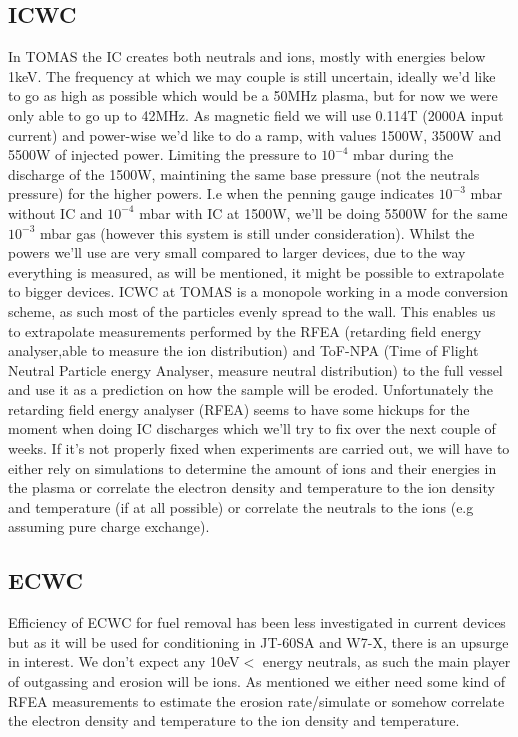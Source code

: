 \documentclass{article}
\begin{document}
\subsection{ICWC}
In TOMAS the IC creates both neutrals and ions, mostly with energies below
1keV.  The frequency at which we may couple is still uncertain, ideally we'd like to
go as high as possible which would be a 50MHz plasma, but for now we were only able to go up to 42MHz. 
As magnetic field we will use 0.114T (2000A input current) and power-wise we'd
like to do a ramp, with values 1500W, 3500W and 5500W of injected power. 
Limiting the pressure to $10^{-4}$ mbar during the discharge of the
1500W, maintining the same base pressure (not the neutrals pressure) for the
higher powers. I.e when the penning gauge indicates $10^{-3}$ mbar without IC
and $10^{-4}$ mbar with IC at 1500W, we'll be doing 5500W for the same
$10^{-3}$ mbar gas (however this system is still under consideration). 
Whilst the powers we'll use are very small compared to
larger devices, due to the way everything is measured, as will be mentioned, it
might be possible to extrapolate to bigger devices.  ICWC at TOMAS is a
monopole working in a mode conversion scheme, as such most of the particles
evenly spread to the wall.  This enables us to extrapolate measurements
performed by the RFEA (retarding field energy analyser,able to  measure the ion distribution) 
and ToF-NPA (Time of Flight Neutral Particle energy Analyser, measure neutral distribution) 
to the full vessel and use it as a prediction on how the sample will be eroded. 
Unfortunately the retarding field energy analyser (RFEA) seems to have some
hickups for the moment when doing IC discharges which we'll try to fix over the
next couple of weeks.  If it's not properly fixed when experiments are carried
out, we will have to either rely on simulations to determine the amount of ions and
their energies in the plasma or correlate the electron density and temperature to the
ion density and temperature (if at all possible) or correlate the neutrals to the ions
(e.g assuming pure charge exchange).
\subsection{ECWC}
Efficiency of ECWC for fuel removal has been less investigated in current
devices but as it will be used for conditioning in JT-60SA and W7-X, there is
an upsurge in interest. We don't expect any 10eV$<$ energy neutrals, as such
the main player of outgassing and erosion will be ions.  As mentioned we either
need some kind of RFEA measurements to estimate the erosion rate/simulate or somehow
correlate the electron density and temperature to the ion density and
temperature.
\end{document}
